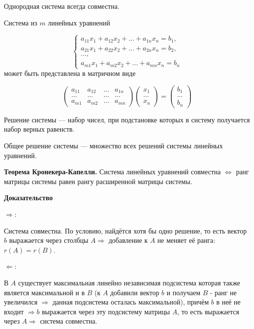 \documentclass[a4paper]{article}
\begin{document}
Однородная система всегда совместна.

Система из $m$ линейных уравнений

\begin{equation}
\begin{cases}
a_{11}x_1 + a_{12}x_2 + ... + a_{1n}x_n = b_1,
\\
a_{21}x_1 + a_{22}x_2 + ... + a_{2n}x_n = b_2,
\\
...,
\\
a_{m1}x_1 + a_{m2}x_2 + ... + a_{mn}x_n = b_n

\end{cases}
\end{equation}
может быть представлена в матричном виде 

\begin{equation}
\begin{pmatrix}
a_{11}& a_{12}& ...& a_{1n}
\\
...& ...& ...& ...
\\
a_{m1}& a_{m2}& ...& a_{mn}
\end{pmatrix} \begin{pmatrix}
x_1
\\
...
\\
x_n
\end{pmatrix} =  \begin{pmatrix}
b_1
\\
...
\\
b_n
\end{pmatrix}
\end{equation}

Решение системы --- набор чисел, при подстановке которых в систему получается набор верных равенств.

Общее решение системы --- множество всех решений системы линейных уравнений.

\begin{htheorem}
\textbf{Теорема Кронекера-Капелли.} Система линейных уравнений совместна $\Leftrightarrow$ ранг матрицы системы равен рангу расширенной матрицы системы.
\end{htheorem}

\begin{hproof}
\textbf{Доказательство}

	$\Rightarrow$:
	
	Система совместна. По условию, найдётся хотя бы одно решение, то есть вектор $b$ выражается через столбцы $A \Rightarrow$ добавление к $A$ не меняет её ранга: $r(A) = r(B)$.
	
	$\Leftarrow$:
	
	В $A$ существует максимальная линейно независимая подсистема которая также является максимальной и в $B$ (к $A$ добавили вектор $b$ и получаем $B$ - ранг не увеличился $\Rightarrow$ данная подсистема осталась максимальной), причём $b$ в неё не входит $\Rightarrow b$ выражается через эту подсистему матрицы $A$, то есть выражается через $A \Rightarrow$ система совместна.
\end{hproof}
\end{document}
